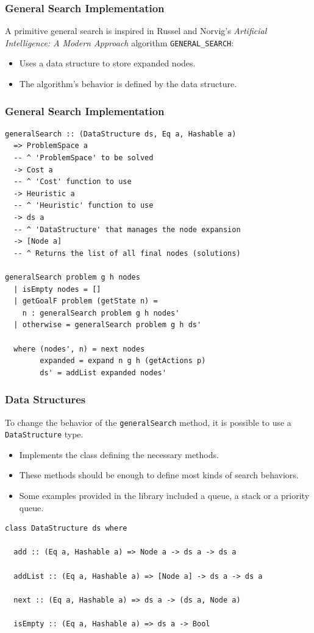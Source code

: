 \documentclass{beamer}
\begin{document}
\begin{frame}
  \frametitle{General Search Implementation}
  A primitive general search is inspired in Russel and Norvig's
  \emph{Artificial Intelligence: A Modern Approach} algorithm
  \texttt{GENERAL\_SEARCH}:
  \begin{itemize}
  \item Uses a data structure to store expanded nodes.
  \item The algorithm's behavior is defined by the data structure.
  \end{itemize}
\end{frame}

\begin{frame}[fragile]
  \frametitle{General Search Implementation}
\begin{lstlisting}[style=haskell]
generalSearch :: (DataStructure ds, Eq a, Hashable a)
  => ProblemSpace a
  -- ^ 'ProblemSpace' to be solved
  -> Cost a
  -- ^ 'Cost' function to use
  -> Heuristic a
  -- ^ 'Heuristic' function to use
  -> ds a
  -- ^ 'DataStructure' that manages the node expansion
  -> [Node a]
  -- ^ Returns the list of all final nodes (solutions)

generalSearch problem g h nodes
  | isEmpty nodes = []
  | getGoalF problem (getState n) =
    n : generalSearch problem g h nodes'
  | otherwise = generalSearch problem g h ds'

  where (nodes', n) = next nodes
        expanded = expand n g h (getActions p)
        ds' = addList expanded nodes'
\end{lstlisting}
\end{frame}

\begin{frame}[fragile]
  \frametitle{Data Structures}
  To change the behavior of the \texttt{generalSearch} method, it is possible
  to use a \texttt{DataStructure} type.
  \begin{itemize}
  \item Implements the class defining the necessary methods.
  \item These methods should be enough to define most kinds of search
    behaviors.
  \item Some examples provided in the library included a queue, a stack or a
    priority queue.
  \end{itemize}
\begin{lstlisting}[style=haskell]
class DataStructure ds where

  add :: (Eq a, Hashable a) => Node a -> ds a -> ds a

  addList :: (Eq a, Hashable a) => [Node a] -> ds a -> ds a

  next :: (Eq a, Hashable a) => ds a -> (ds a, Node a)

  isEmpty :: (Eq a, Hashable a) => ds a -> Bool
\end{lstlisting}
\end{frame}
\end{document}
